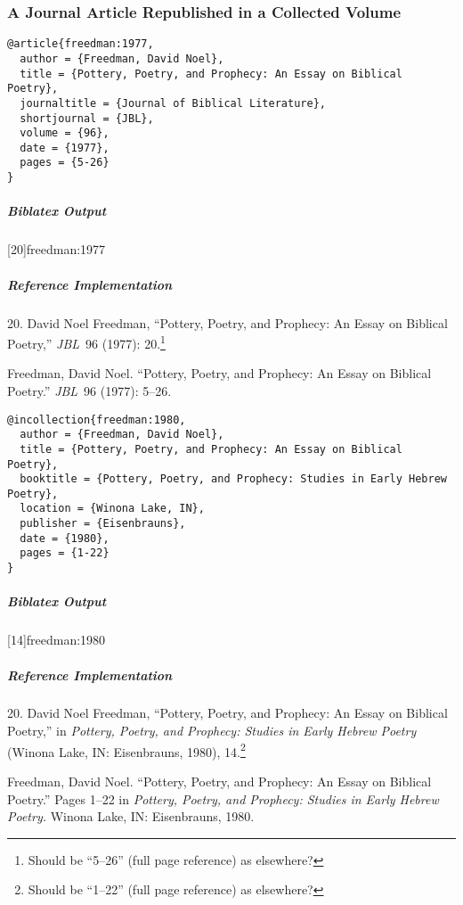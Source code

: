 \documentclass[a4paper]{article}
\newenvironment{biboutput}{%
  \subparagraph{Biblatex Output}
}{\color{black}}
\newenvironment{refimp}{%
  \subparagraph{Reference Implementation}
  \color{reference-colour}
  \rm
}{\par\color{black}}
\begin{document}
\subsubsection{A Journal Article Republished in a Collected Volume}

\begin{lstlisting}
@article{freedman:1977,
  author = {Freedman, David Noel},
  title = {Pottery, Poetry, and Prophecy: An Essay on Biblical Poetry},
  journaltitle = {Journal of Biblical Literature},
  shortjournal = {JBL},
  volume = {96},
  date = {1977},
  pages = {5-26}
}
\end{lstlisting}

\begin{biboutput}
  [20]{freedman:1977}
\end{biboutput}

\begin{refimp}
  \hspace*{\bibindent}20. David Noel Freedman, “Pottery, Poetry, and Prophecy:
  An Essay on Biblical Poetry,” \emph{JBL}~96 (1977): 20.\footnote{Should be
  “5–26” (full page reference) as elsewhere?}

  \hangindent\bibindent Freedman, David Noel. “Pottery, Poetry, and Prophecy:
  An Essay on Biblical Poetry.” \emph{JBL}~96 (1977): 5–26.

\end{refimp}

\begin{lstlisting}
@incollection{freedman:1980,
  author = {Freedman, David Noel},
  title = {Pottery, Poetry, and Prophecy: An Essay on Biblical Poetry},
  booktitle = {Pottery, Poetry, and Prophecy: Studies in Early Hebrew Poetry},
  location = {Winona Lake, IN},
  publisher = {Eisenbrauns},
  date = {1980},
  pages = {1-22}
}
\end{lstlisting}

\begin{biboutput}
  [14]{freedman:1980}
\end{biboutput}

\begin{refimp}
  \hspace*{\bibindent}20. David Noel Freedman, “Pottery, Poetry, and Prophecy:
  An Essay on Biblical Poetry,” in \emph{Pottery, Poetry, and Prophecy:
  Studies in Early Hebrew Poetry} (Winona Lake, IN: Eisenbrauns, 1980),
  14.\footnote{Should be “1–22” (full page reference) as elsewhere?}

  \hangindent\bibindent Freedman, David Noel. “Pottery, Poetry, and Prophecy:
  An Essay on Biblical Poetry.” Pages 1–22 in \emph{Pottery, Poetry, and
  Prophecy: Studies in Early Hebrew Poetry.} Winona Lake, IN: Eisenbrauns,
  1980.
\end{refimp}
\end{document}
